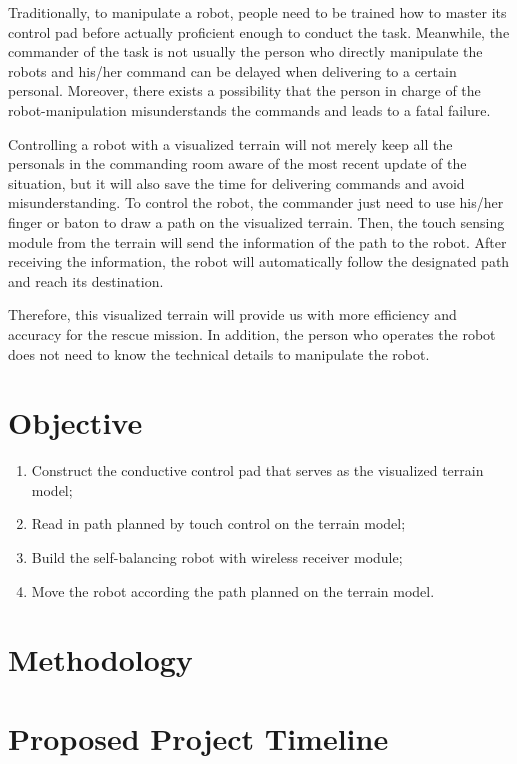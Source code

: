 \documentclass[a4paper,12pt]{article}
\begin{document}
Traditionally, to manipulate a robot, people need to be trained how to master its control pad before actually proficient enough to conduct the task. Meanwhile, the commander of the task is not usually the person who directly manipulate the robots and his/her command can be delayed when delivering to a certain personal. Moreover, there exists a possibility that the person in charge of the robot-manipulation misunderstands the commands and leads to a fatal failure. 

Controlling a robot with a visualized terrain will not merely keep all the personals in the commanding room aware of the most recent update of the situation, but it will also save the time for delivering commands and avoid misunderstanding. To control the robot, the commander just need to use his/her finger or baton to draw a path on the visualized terrain. Then, the touch sensing module from the terrain will send the information of the path to the robot. After receiving the information, the robot will automatically follow the designated path and reach its destination.

Therefore, this visualized terrain will provide us with more efficiency and accuracy for the rescue mission. In addition, the person who operates the robot does not need to know the technical details to manipulate the robot.

\section{Objective}

\begin{enumerate}
	\item Construct the conductive control pad that serves as the visualized terrain model;
	\item Read in path planned by touch control on the terrain model; 
	\item Build the self-balancing robot with wireless receiver module;
	\item Move the robot according the path planned on the terrain model.
\end{enumerate}


\section{Methodology}



\section{Proposed Project Timeline}
\end{document}
